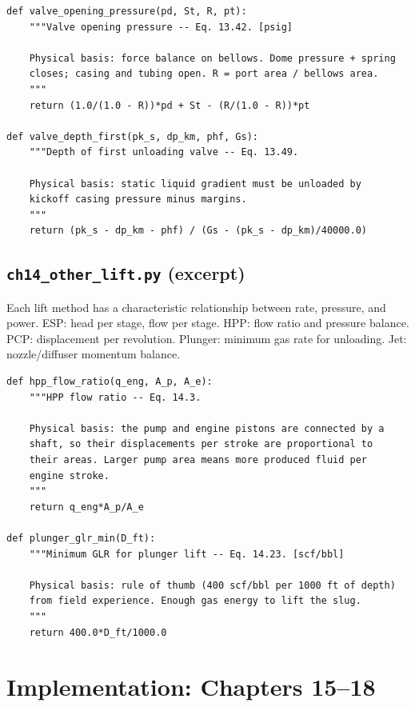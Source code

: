 \documentclass[11pt,a4paper,openany]{book}
\newcommand{\code}[1]{\texttt{#1}}
\begin{document}
\begin{lstlisting}
def valve_opening_pressure(pd, St, R, pt):
    """Valve opening pressure -- Eq. 13.42. [psig]

    Physical basis: force balance on bellows. Dome pressure + spring
    closes; casing and tubing open. R = port area / bellows area.
    """
    return (1.0/(1.0 - R))*pd + St - (R/(1.0 - R))*pt

def valve_depth_first(pk_s, dp_km, phf, Gs):
    """Depth of first unloading valve -- Eq. 13.49.

    Physical basis: static liquid gradient must be unloaded by
    kickoff casing pressure minus margins.
    """
    return (pk_s - dp_km - phf) / (Gs - (pk_s - dp_km)/40000.0)
\end{lstlisting}

\section{\code{ch14\_other\_lift.py} (excerpt)}

\begin{theory}
Each lift method has a characteristic relationship between rate,
pressure, and power. ESP: head per stage, flow per stage. HPP:
flow ratio and pressure balance. PCP: displacement per revolution.
Plunger: minimum gas rate for unloading. Jet: nozzle/diffuser
momentum balance.
\end{theory}

\begin{lstlisting}
def hpp_flow_ratio(q_eng, A_p, A_e):
    """HPP flow ratio -- Eq. 14.3.

    Physical basis: the pump and engine pistons are connected by a
    shaft, so their displacements per stroke are proportional to
    their areas. Larger pump area means more produced fluid per
    engine stroke.
    """
    return q_eng*A_p/A_e

def plunger_glr_min(D_ft):
    """Minimum GLR for plunger lift -- Eq. 14.23. [scf/bbl]

    Physical basis: rule of thumb (400 scf/bbl per 1000 ft of depth)
    from field experience. Enough gas energy to lift the slug.
    """
    return 400.0*D_ft/1000.0
\end{lstlisting}

\chapter{Implementation: Chapters 15--18}
\end{document}
